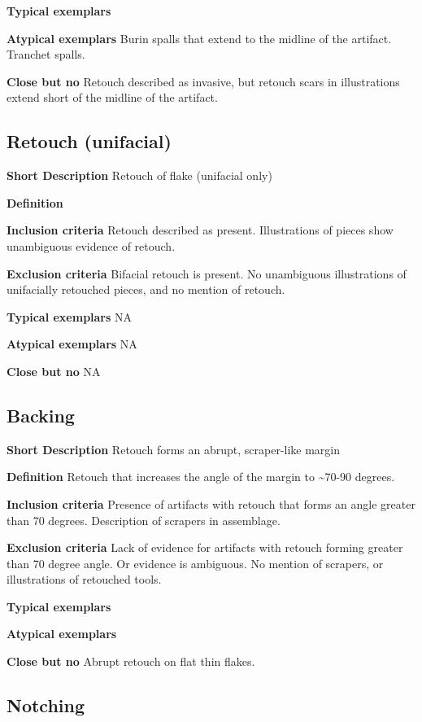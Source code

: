 \documentclass[
]{article}
\begin{document}
\textbf{Typical exemplars}

\textbf{Atypical exemplars} Burin spalls that extend to the midline of
the artifact. Tranchet spalls.

\textbf{Close but no} Retouch described as invasive, but retouch scars
in illustrations extend short of the midline of the artifact.

\hypertarget{retouch-unifacial}{%
\subsection{Retouch (unifacial)}\label{retouch-unifacial}}

\textbf{Short Description} Retouch of flake (unifacial only)

\textbf{Definition}

\textbf{Inclusion criteria} Retouch described as present. Illustrations
of pieces show unambiguous evidence of retouch.

\textbf{Exclusion criteria} Bifacial retouch is present. No unambiguous
illustrations of unifacially retouched pieces, and no mention of
retouch.

\textbf{Typical exemplars} NA

\textbf{Atypical exemplars} NA

\textbf{Close but no} NA

\hypertarget{backing}{%
\subsection{Backing}\label{backing}}

\textbf{Short Description} Retouch forms an abrupt, scraper-like margin

\textbf{Definition} Retouch that increases the angle of the margin to
\textasciitilde70-90 degrees.

\textbf{Inclusion criteria} Presence of artifacts with retouch that
forms an angle greater than 70 degrees. Description of scrapers in
assemblage.

\textbf{Exclusion criteria} Lack of evidence for artifacts with retouch
forming greater than 70 degree angle. Or evidence is ambiguous. No
mention of scrapers, or illustrations of retouched tools.

\textbf{Typical exemplars}

\textbf{Atypical exemplars}

\textbf{Close but no} Abrupt retouch on flat thin flakes.

\hypertarget{notching}{%
\subsection{Notching}\label{notching}}
\end{document}
